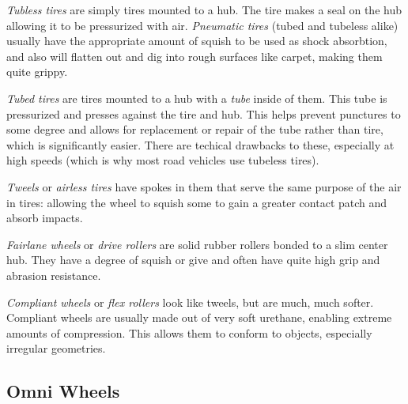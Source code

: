 	\begin{asparaenum}[a)] 
		\item \textit{Tubless tires} are simply tires mounted to a hub. The tire makes a seal on the hub allowing it to be pressurized with air. \textit{Pneumatic tires} (tubed and tubeless alike) usually have the appropriate amount of squish to be used as shock absorbtion, and also will flatten out and dig into rough surfaces like carpet, making them quite grippy.
		\item \textit{Tubed tires} are tires mounted to a hub with a \textit{tube} inside of them. This tube is pressurized and presses against the tire and hub. This helps prevent punctures to some degree and allows for replacement or repair of the tube rather than tire, which is significantly easier. There are techical drawbacks to these, especially at high speeds (which is why most road vehicles use tubeless tires).	
		\item \textit{Tweels} or \textit{airless tires} have spokes in them that serve the same purpose of the air in tires: allowing the wheel to squish some to gain a greater contact patch and absorb impacts.
		\item \textit{Fairlane wheels} or \textit{drive rollers} are solid rubber rollers bonded to a slim center hub. They have a degree of squish or give and often have quite high grip and abrasion resistance.
		\item \textit{Compliant wheels} or \textit{flex rollers} look like tweels, but are much, much softer. Compliant wheels are usually made out of very soft urethane, enabling extreme amounts of compression. This allows them to conform to objects, especially irregular geometries.
	\end{asparaenum}
	
	\subsection{Omni Wheels}
	
